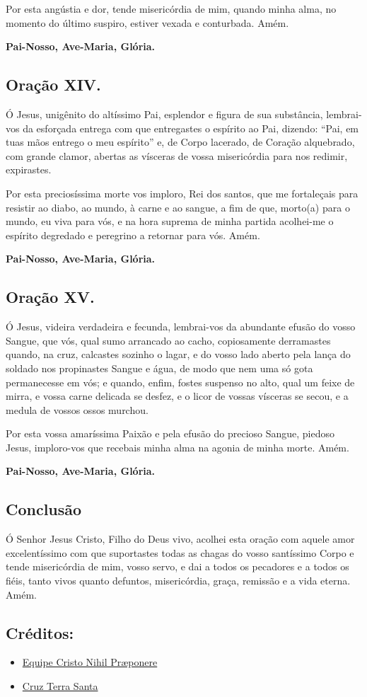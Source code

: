 \documentclass[11pt]{article}
\begin{document}
Por esta angústia e dor, tende misericórdia de mim, quando minha alma, no momento do último suspiro, estiver vexada e conturbada. Amém. 

\textbf{Pai-Nosso, Ave-Maria, Glória.}

\subsection{Oração XIV.}
Ó Jesus, unigênito do altíssimo Pai, esplendor e figura de sua substância, lembrai-vos da esforçada entrega com que entregastes o espírito ao Pai, dizendo: “Pai, em tuas mãos entrego o meu espírito” e, de Corpo lacerado, de Coração alquebrado, com grande clamor, abertas as vísceras de vossa misericórdia para nos redimir, expirastes.

Por esta preciosíssima morte vos imploro, Rei dos santos, que me fortaleçais para resistir ao diabo, ao mundo, à carne e ao sangue, a fim de que, morto(a) para o mundo, eu viva para vós, e na hora suprema de minha partida acolhei-me o espírito degredado e peregrino a retornar para vós. Amém. 

\textbf{Pai-Nosso, Ave-Maria, Glória.}

\subsection{Oração XV.}
Ó Jesus, videira verdadeira e fecunda, lembrai-vos da abundante efusão do vosso Sangue, que vós, qual sumo arrancado ao cacho, copiosamente derramastes quando, na cruz, calcastes sozinho o lagar, e do vosso lado aberto pela lança do soldado nos propinastes Sangue e água, de modo que nem uma só gota permanecesse em vós; e quando, enfim, fostes suspenso no alto, qual um feixe de mirra, e vossa carne delicada se desfez, e o licor de vossas vísceras se secou, e a medula de vossos ossos murchou. 

Por esta vossa amaríssima Paixão e pela efusão do precioso Sangue, piedoso Jesus, imploro-vos que recebais minha alma na agonia de minha morte. Amém. 

\textbf{Pai-Nosso, Ave-Maria, Glória.}

\vfill
\subsection{Conclusão} Ó Senhor Jesus Cristo, Filho do Deus vivo, acolhei esta oração com aquele amor excelentíssimo com que suportastes todas as chagas do vosso santíssimo Corpo e tende misericórdia de mim, vosso servo, e dai a todos os pecadores e a todos os fiéis, tanto vivos quanto defuntos, misericórdia, graça, remissão e a vida eterna. Amém.

\subsection*{Créditos:}
\begin{itemize}
 \item \href{https://padrepauloricardo.org/blog/quinze-oracoes-em-honra-a-paixao-de-cristo}{Equipe Cristo Nihil Pr\ae ponere}
 \item \href{https://cruzterrasanta.com.br/oracao-terco-de-santa-brigida/399/105/}{Cruz Terra Santa}
\end{itemize}
\end{document}
